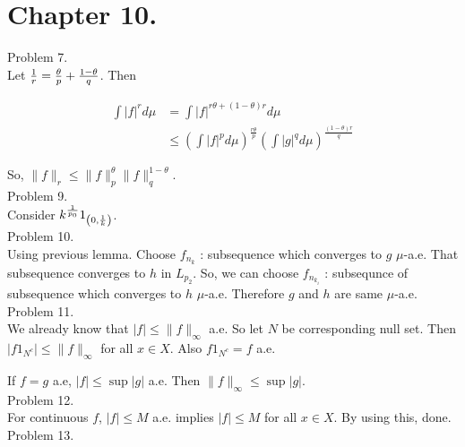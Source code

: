 \section*{Chapter 10.}

Problem 7. \\

Let ${1\over r} = {\theta \over p} + {1 - \theta \over q}$. Then

\begin{equation*}
	\begin{split}
		\int |f|^r d\mu & = \int |f|^{r\theta + \left( 1-\theta \right)r} d\mu \\
		& \leq \left( \int |f|^p d\mu \right)^{\frac{r\theta}{p}} \left( \int |g|^q d\mu \right) ^{\frac{\left( 1-\theta \right)r}{q}}
	\end{split}
	\label{<+label+>}
\end{equation*}

So, $\| f \| _r \leq \|f \|_p^{\theta} \| f \|_q^{1-\theta}$.\\

Problem 9. \\

Consider $k^{1 \over p_0} 1_{\left( 0, {1\over k} \right)}$. \\

Problem 10. \\

Using previous lemma. Choose $f_{n_{k}}$ : subsequence which converges to $g$ $\mu$-a.e. That subsequence converges to $h$ in $L_{p_2}$. So, we can choose $f_{n_{k_i}}$ : subsequnce of subsequence which converges to $h$ $\mu$-a.e. Therefore $g$ and $h$ are same $\mu$-a.e. \\

Problem 11. \\

We already know that $|f| \leq \|f \|_{\infty}$ a.e. So let $N$ be corresponding null set. Then $|f 1_{N^c}| \leq \| f \| _{\infty}$ for all $x \in X$. Also $f 1_{N^c} = f$ a.e.

If $f=g$ a.e, $|f| \leq \sup |g|$ a.e. Then $\| f \| _{\infty} \leq \sup |g|$. \\

Problem 12. \\

For continuous $f$, $|f| \leq M$ a.e. implies $|f| \leq M$ for all $x\in X$. By using this, done. \\

Problem 13. \\


